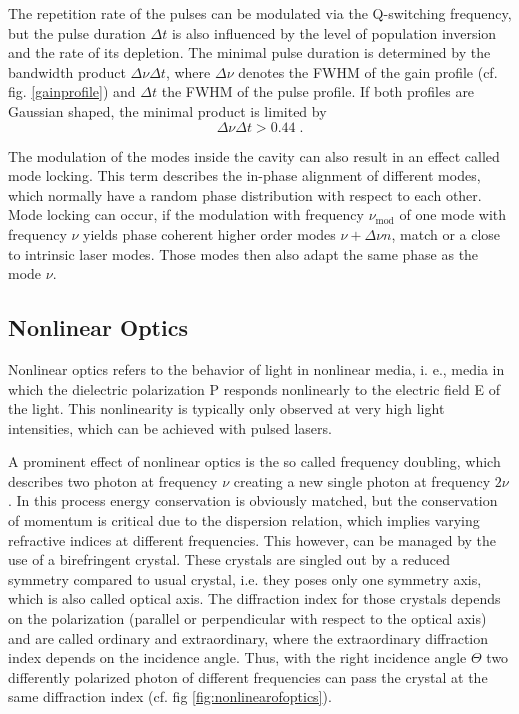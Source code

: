 \documentclass[a4paper]{scrartcl}
\numberwithin{equation}{section}
\numberwithin{figure}{section}
\numberwithin{table}{section}
\newcommand{\eq}[2]{\begin{equation}#1\label{#2}\end{equation}}
\begin{document}
The repetition rate of the pulses can  be modulated via the Q-switching frequency, but the pulse duration $\Delta t$ is also influenced by the level of population inversion and the rate of its depletion. The minimal pulse duration is determined by the bandwidth product $\Delta \nu \Delta t$, where $\Delta \nu$ denotes the FWHM of the gain profile (cf. fig. \ref{gainprofile}) and $\Delta t$ the FWHM of the pulse profile. If both profiles are Gaussian shaped, the minimal product is limited by
\eq{\Delta \nu \Delta t > 0.44 \; .}{ftw}

The modulation of the modes inside the cavity can also result in an effect called mode locking. This term describes the in-phase alignment of different modes, which normally have a random phase distribution with respect to each other. Mode locking can occur, if the modulation with frequency $\nu_\text{mod}$ of one mode with frequency $\nu$ yields phase coherent higher order modes $\nu + \Delta \nu n$, match or a close to intrinsic laser modes. Those modes then also adapt the same phase as the mode $\nu$. 

\subsection{Nonlinear 
Optics}
Nonlinear optics refers to the behavior of light in nonlinear media, i. e., media in which the dielectric polarization P responds nonlinearly to the electric field E of the light. This nonlinearity is typically only observed at very high light intensities, which can be achieved with pulsed lasers.
 
A prominent effect of nonlinear optics is the so called frequency doubling, which describes two photon at frequency $\nu$ creating a new single photon at frequency $2 \nu$. In this process energy conservation is obviously matched, but the conservation of momentum is critical due to the dispersion relation, which implies varying refractive indices at different frequencies. This however, can be managed by the use of a birefringent crystal. These crystals are singled out by a reduced symmetry compared to usual crystal, i.e. they poses only one symmetry axis, which is also called optical axis. The diffraction index for those crystals depends on the polarization (parallel or perpendicular with respect to the optical axis) and are called ordinary and extraordinary, where the extraordinary diffraction index depends on the incidence angle. Thus, with the right incidence angle $\Theta$ two differently polarized photon of different frequencies can pass the crystal at the same diffraction index (cf. fig \ref{fig:nonlinearofoptics}).
\end{document}
